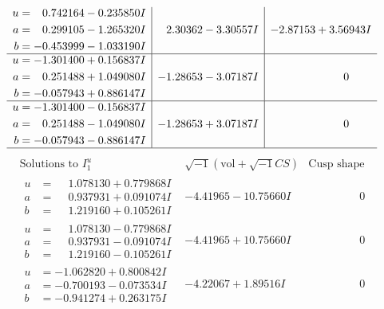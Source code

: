 \documentclass[1p]{elsarticle_modified}
\theoremstyle{definition}
\newcommand{\I}{\sqrt{-1}}
\begin{document}
$$\begin{array}{c|c|c}
\begin{aligned}
u &= \phantom{-}0.742164 - 0.235850 I \\
a &= \phantom{-}0.299105 - 1.265320 I \\
b &= -0.453999 - 1.033190 I\end{aligned}
 & \phantom{-}2.30362 - 3.30557 I & -2.87153 + 3.56943 I \\ \hline\begin{aligned}
u &= -1.301400 + 0.156837 I \\
a &= \phantom{-}0.251488 + 1.049080 I \\
b &= -0.057943 + 0.886147 I\end{aligned}
 & -1.28653 - 3.07187 I & \phantom{-0.000000 } 0 \\ \hline\begin{aligned}
u &= -1.301400 - 0.156837 I \\
a &= \phantom{-}0.251488 - 1.049080 I \\
b &= -0.057943 - 0.886147 I\end{aligned}
 & -1.28653 + 3.07187 I & \phantom{-0.000000 } 0\\
 \hline 
 \end{array}$$\newpage$$\begin{array}{c|c|c}  
\text{Solutions to }I^u_{1}& \I (\text{vol} + \sqrt{-1}CS) & \text{Cusp shape}\\
 \hline 
\begin{aligned}
u &= \phantom{-}1.078130 + 0.779868 I \\
a &= \phantom{-}0.937931 + 0.091074 I \\
b &= \phantom{-}1.219160 + 0.105261 I\end{aligned}
 & -4.41965 - 10.75660 I & \phantom{-0.000000 } 0 \\ \hline\begin{aligned}
u &= \phantom{-}1.078130 - 0.779868 I \\
a &= \phantom{-}0.937931 - 0.091074 I \\
b &= \phantom{-}1.219160 - 0.105261 I\end{aligned}
 & -4.41965 + 10.75660 I & \phantom{-0.000000 } 0 \\ \hline\begin{aligned}
u &= -1.062820 + 0.800842 I \\
a &= -0.700193 - 0.073534 I \\
b &= -0.941274 + 0.263175 I\end{aligned}
 & -4.22067 + 1.89516 I & \phantom{-0.000000 } 0 \\ \hline\begin{aligned}

\end{aligned}
\end{array}$$
\end{document}
